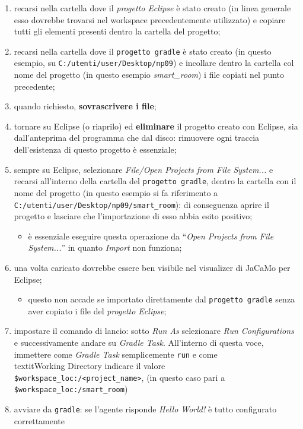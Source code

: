 \documentclass[12pt,a4paper,openright,oneside]{report}
\newcommand{\quotes}[1]{``#1''}
\begin{document}
\begin{enumerate}
	\item recarsi nella cartella dove il \textit{progetto Eclipse} è stato creato (in linea generale esso dovrebbe trovarsi nel workspace precedentemente utilizzato) e copiare tutti gli elementi presenti dentro la cartella del progetto;
	
	\item recarsi nella cartella dove il \texttt{progetto gradle} è stato creato (in questo esempio, su \texttt{C:/utenti/user/Desktop/np09}) e incollare dentro la cartella col nome del progetto (in questo esempio \textit{smart\_room}) i file copiati nel punto precedente;
	
	\item quando richiesto, \textbf{sovrascrivere i file};
	
	\item tornare su Eclipse (o riaprilo) ed \textbf{eliminare} il progetto creato con Eclipse, sia dall'anteprima del programma che dal disco: rimuovere ogni traccia dell'esistenza di questo progetto è essenziale;
	
	\item sempre su Eclipse, selezionare \textit{File/Open Projects from File System...} e recarsi all'interno della cartella del \texttt{progetto gradle}, dentro la cartella con il nome del progetto (in questo esempio si fa riferimento a \texttt{C:/utenti/user/Desktop/np09/smart\_room}): di conseguenza aprire il progetto e lasciare che l'importazione di esso abbia esito positivo;
	\begin{itemize}
		\item è essenziale eseguire questa operazione da \quotes{\textit{Open Projects from File System...}} in quanto \textit{Import} non funziona;
	\end{itemize}
	
	\item una volta caricato dovrebbe essere ben visibile nel visualizer di JaCaMo per Eclipse;
	\begin{itemize}
		\item questo non accade se importato direttamente dal \texttt{progetto gradle} senza aver copiato i file del \textit{progetto Eclipse};
	\end{itemize}
	
	\item impostare il comando di lancio: sotto \textit{Run As} selezionare \textit{Run Configurations} e successivamente andare su \textit{Gradle Task}. All'interno di questa voce, immettere come \textit{Gradle Task} semplicemente \texttt{run} e come \\textit{Working Directory} indicare il valore\\
		\texttt{\${workspace\_loc:/<project\_name>}}, (in questo caso pari a \\
		\texttt{\$workspace\_loc:/smart\_room})
		
	\item avviare da \texttt{gradle}: se l'agente risponde \textit{Hello World!} è tutto configurato correttamente
\end{enumerate}
\end{document}
